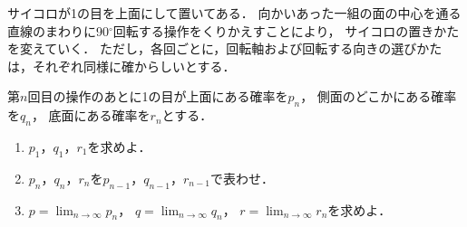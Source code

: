 \documentclass[../../main.tex]{subfiles}
\begin{document}
サイコロが1の目を上面にして置いてある．
向かいあった一組の面の中心を通る直線のまわりに90$^\circ$回転する操作をくりかえすことにより，
サイコロの置きかたを変えていく．
ただし，各回ごとに，回転軸および回転する向きの選びかたは，それぞれ同様に確からしいとする．

第$n$回目の操作のあとに1の目が上面にある確率を$p_n$，
側面のどこかにある確率を$q_n$，
底面にある確率を$r_n$とする．
\begin{enumerate}
  \item $p_1$，$q_1$，$r_1$を求めよ．
  \item $p_n$，$q_n$，$r_n$を$p_{n-1}$，$q_{n-1}$，$r_{n-1}$で表わせ．
  \item $\displaystyle p=\lim_{n\to\infty}p_n$，
    $\displaystyle q=\lim_{n\to\infty}q_n$，
    $\displaystyle r=\lim_{n\to\infty}r_n$を求めよ．
\end{enumerate}
\end{document}
